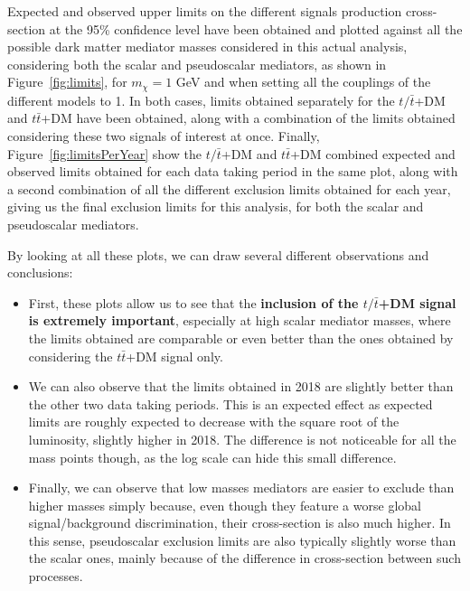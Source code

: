 \documentclass[a4paper, 10pt, openright]{report}
\begin{document}
Expected and observed upper limits on the different signals production cross-section at the 95\% confidence level have been obtained and plotted against all the possible dark matter mediator masses considered in this actual analysis, considering both the scalar and pseudoscalar mediators, as shown in Figure~\ref{fig:limits}, for $m_\chi = 1$ GeV and when setting all the couplings of the different models to 1. In both cases, limits obtained separately for the $t/\bar t$+DM and $t \bar t$+DM have been obtained, along with a combination of the limits obtained considering these two signals of interest at once. Finally, Figure~\ref{fig:limitsPerYear} show the $t/\bar t$+DM and $t \bar t$+DM combined expected and observed limits obtained for each data taking period in the same plot, along with a second combination of all the different exclusion limits obtained for each year, giving us the final exclusion limits for this analysis, for both the scalar and pseudoscalar mediators.

By looking at all these plots, we can draw several different observations and conclusions:
\begin{itemize}
\item First, these plots allow us to see that the \textbf{inclusion of the $t/\bar t$+DM signal is extremely important}, especially at high scalar mediator masses, where the limits obtained are comparable or even better than the ones obtained by considering the $t \bar t$+DM signal only.
\item We can also observe that the limits obtained in 2018 are slightly better than the other two data taking periods. This is an expected effect as expected limits are roughly expected to decrease with the square root of the luminosity, slightly higher in 2018. The difference is not	noticeable for all the mass points though, as the log scale can hide this small difference.
\item Finally, we can observe that low masses mediators are easier to exclude than higher masses simply because, even though they feature a worse global signal/background discrimination, their cross-section is also much higher. In this sense, pseudoscalar exclusion limits are also typically slightly worse than the scalar ones, mainly because of the difference in cross-section between such processes.
\end{itemize}
\end{document}
